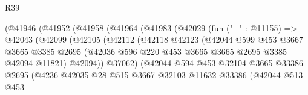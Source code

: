 \begin{lexlean}{R39}
\begin{coremodule}
                          (@41946
                            (@41952
                              (@41958
                                (@41964
                                  (@41983
                                    (@42029
                                      (fun ("_" : @11155) =>
                                      @42043
                                        (@42099
                                          (@42105
                                            (@42112
                                              (@42118
                                                @42123
                                                (@42044
                                                  @599
                                                  @453
                                                  @3667
                                                  @3665
                                                  @3385
                                                  @2695
                                                  (@42036
                                                    @596
                                                    @220
                                                    @453
                                                    @3665
                                                    @3665
                                                    @2695
                                                    @3385
                                                    @42094
                                                    @11821)
                                                  @42094))
                                              @37062)
                                            (@42044
                                              @594
                                              @453
                                              @32104
                                              @3665
                                              @33386
                                              @2695
                                              (@4236
                                                @42035
                                                @28
                                                @515
                                                @3667
                                                @32103
                                                @11632
                                                @33386
                                                (@42044
                                                  @513
                                                  @453

\end{coremodule}
\end{lexlean}
